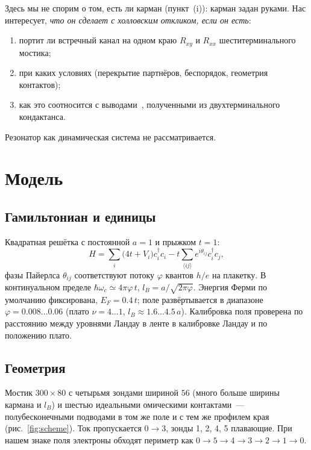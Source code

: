 \documentclass[11pt,a4paper]{article}
\newcommand{\Rxy}{R_{xy}}
\newcommand{\Rxx}{R_{xx}}
\newcommand{\lB}{l_B}
\newcommand{\EF}{E_F}
\newcommand{\hw}{\hbar\omega_c}
\begin{document}
Здесь мы не спорим о том, есть ли карман (пункт~(i)): карман задан руками.
Нас интересует, \emph{что он сделает с холловским откликом, если он есть}:
\begin{enumerate}
\item портит ли встречный канал на одном краю $\Rxy$ и $\Rxx$
      шеститерминального мостика;
\item при каких условиях (перекрытие партнёров, беспорядок, геометрия
      контактов);
\item как это соотносится с выводами~\cite{andolina}, полученными из
      двухтерминального кондактанса.
\end{enumerate}
Резонатор как динамическая система не рассматривается.

\section{Модель}

\subsection{Гамильтониан и единицы}
Квадратная решётка с постоянной $a=1$ и прыжком $t=1$:
\begin{equation}
H=\sum_i\bigl(4t+V_i\bigr)c_i^\dagger c_i-t\sum_{\langle ij\rangle}
e^{i\theta_{ij}}c_i^\dagger c_j,
\end{equation}
фазы Пайерлса $\theta_{ij}$ соответствуют потоку $\varphi$ квантов $h/e$ на
плакетку. В континуальном пределе
$\hw\simeq4\pi\varphi\,t$, $\lB=a/\sqrt{2\pi\varphi}$.
Энергия Ферми по умолчанию фиксирована, $\EF=0.4\,t$; поле развёртывается в
диапазоне $\varphi=0.008\ldots0.06$ (плато $\nu=4\ldots1$,
$\lB\approx1.6\ldots4.5\,a$). Калибровка поля проверена по расстоянию между
уровнями Ландау в ленте в калибровке Ландау и по положению плато.

\subsection{Геометрия}
Мостик $300\times80$ с четырьмя зондами шириной $56$ (много больше ширины
кармана и $\lB$) и шестью идеальными омическими контактами~---
полубесконечными подводами в том же поле и с тем же профилем края
(рис.~\ref{fig:scheme}). Ток пропускается $0\to3$, зонды 1, 2, 4, 5
плавающие. При нашем знаке поля электроны обходят периметр как
$0\to5\to4\to3\to2\to1\to0$.
\end{document}
